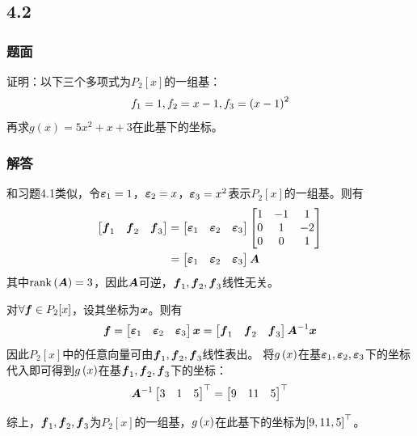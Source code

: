 \documentclass{beamer}
\begin{document}
\subsection*{4.2}
\begin{frame}
    \frametitle{题面}
    证明：以下三个多项式为\(P_2[x]\)的一组基：
    \begin{equation*}
        f_1=1,f_2=x-1,f_3=\left( x-1 \right)^2
    \end{equation*}
    再求\(g(x)=5x^2+x+3\)在此基下的坐标。
\end{frame}

\begin{frame}
    \frametitle{解答}
    和习题4.1类似，令\(\boldsymbol{\varepsilon}_1=1\)，\(\boldsymbol{\varepsilon}_2=x\)，\(\boldsymbol{\varepsilon}_3=x^2\)表示\(P_2[x]\)的一组基。则有
    \begin{align*}
        \begin{bmatrix}
            \boldsymbol{f}_1 & \boldsymbol{f}_2 & \boldsymbol{f}_3
        \end{bmatrix}
         & =
        \begin{bmatrix}
            \boldsymbol{\varepsilon}_1 & \boldsymbol{\varepsilon}_2 & \boldsymbol{\varepsilon}_3
        \end{bmatrix}
        \begin{bmatrix}
            1 & -1 & 1  \\
            0 & 1  & -2 \\
            0 & 0  & 1
        \end{bmatrix} \\
         & =
        \begin{bmatrix}
            \boldsymbol{\varepsilon}_1 & \boldsymbol{\varepsilon}_2 & \boldsymbol{\varepsilon}_3
        \end{bmatrix}\boldsymbol{A}
    \end{align*}
    其中\(\mathrm{rank}\left( \boldsymbol{A} \right)=3\)，因此\(\boldsymbol{A}\)可逆，\(\boldsymbol{f}_1,\boldsymbol{f}_2,\boldsymbol{f}_3\)线性无关。

    \pause

    对\(\forall\boldsymbol{f}\in P_2[x]\)，设其坐标为\(\boldsymbol{x}\)。则有
    \begin{equation*}
        \boldsymbol{f}=
        \begin{bmatrix}
            \boldsymbol{\varepsilon}_1 & \boldsymbol{\varepsilon}_2 & \boldsymbol{\varepsilon}_3
        \end{bmatrix}\boldsymbol{x}=
        \begin{bmatrix}
            \boldsymbol{f}_1 & \boldsymbol{f}_2 & \boldsymbol{f}_3
        \end{bmatrix}{\boldsymbol{A}}^{-1}\boldsymbol{x}
    \end{equation*}
    因此\(P_2[x]\)中的任意向量可由\(\boldsymbol{f}_1,\boldsymbol{f}_2,\boldsymbol{f}_3\)线性表出。
    将\(g\left( x \right)\)在基\(\boldsymbol{\varepsilon}_1,\boldsymbol{\varepsilon}_2,\boldsymbol{\varepsilon}_3\)下的坐标代入即可得到\(g\left( x \right)\)在基\(\boldsymbol{f}_1,\boldsymbol{f}_2,\boldsymbol{f}_3\)下的坐标：
    \begin{equation*}
        {\boldsymbol{A}}^{-1}\begin{bmatrix}3&1&5\end{bmatrix}^\top=\begin{bmatrix}9&11&5\end{bmatrix}^\top
    \end{equation*}

    综上，\(\boldsymbol{f}_1,\boldsymbol{f}_2,\boldsymbol{f}_3\)为\(P_2[x]\)的一组基，\(g\left( x \right)\)在此基下的坐标为\(\left[ 9,11,5 \right]^\top\)。
\end{frame}
\end{document}
